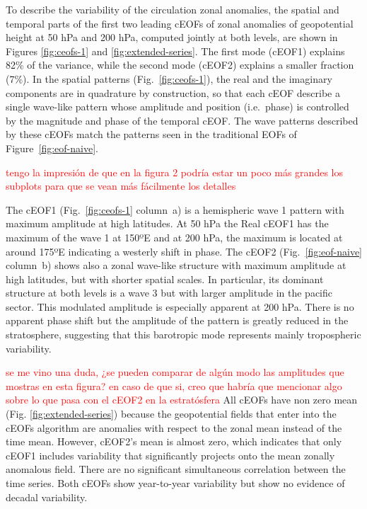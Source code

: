 \documentclass[smallextended]{svjour3}       %
\begin{document}
To describe the variability of the circulation zonal anomalies, the spatial and temporal parts of the first two leading cEOFs of zonal anomalies of geopotential height at 50 hPa and 200 hPa, computed jointly at both levels, are shown in Figures \ref{fig:ceofs-1} and \ref{fig:extended-series}.
The first mode (cEOF1) explains 82\% of the variance, while the second mode (cEOF2) explains a smaller fraction (7\%).
In the spatial patterns (Fig.~\ref{fig:ceofs-1}), the real and the imaginary components are in quadrature by construction, so that each cEOF describe a single wave-like pattern whose amplitude and position (i.e.~phase) is controlled by the magnitude and phase of the temporal cEOF.
The wave patterns described by these cEOFs match the patterns seen in the traditional EOFs of Figure~\ref{fig:eof-naive}.

\textcolor{red}{tengo la impresión de que en la figura 2 podría estar un poco más grandes los subplots para que se vean más fácilmente los detalles}

The cEOF1 (Fig.~\ref{fig:ceofs-1} column~a) is a hemispheric wave 1 pattern with maximum amplitude at high latitudes.
At 50 hPa the Real cEOF1 has the maximum of the wave 1 at 150ºE and at 200 hPa, the maximum is located at around 175ºE indicating a westerly shift in phase.
The cEOF2 (Fig.~\ref{fig:eof-naive} column~b) shows also a zonal wave-like structure with maximum amplitude at high latitudes, but with shorter spatial scales.
In particular, its dominant structure at both levels is a wave 3 but with larger amplitude in the pacific sector.
This modulated amplitude is especially apparent at 200 hPa.
There is no apparent phase shift but the amplitude of the pattern is greatly reduced in the stratosphere, suggesting that this barotropic mode represents mainly tropospheric variability.

\textcolor{red}{se me vino una duda, ¿se pueden comparar de algún modo las amplitudes que mostras en esta figura? en caso de que si, creo que habría que mencionar algo sobre lo que pasa con el cEOF2 en la estratósfera} All cEOFs have non zero mean (Fig. \ref{fig:extended-series}) because the geopotential fields that enter into the cEOFs algorithm are anomalies with respect to the zonal mean instead of the time mean.
However, cEOF2's mean is almost zero, which indicates that only cEOF1 includes variability that significantly projects onto the mean zonally anomalous field.
There are no significant simultaneous correlation between the time series.
Both cEOFs show year-to-year variability but show no evidence of decadal variability.
\end{document}
